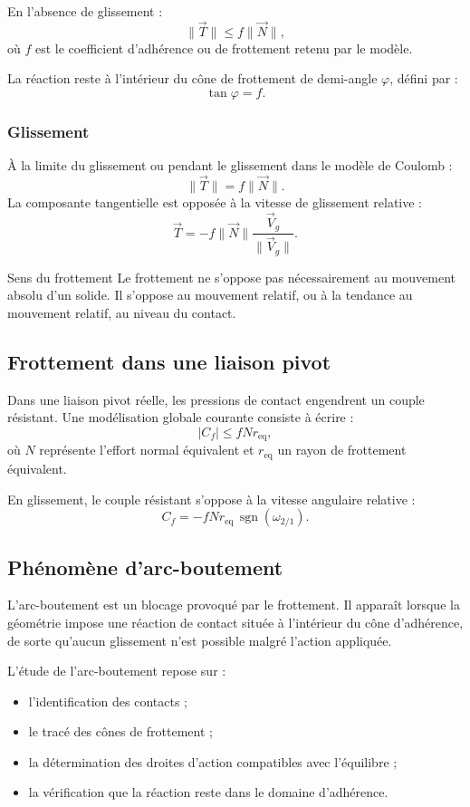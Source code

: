 En l'absence de glissement :
\[
\|\vec T\|\leq f\|\vec N\|,
\]
où $f$ est le coefficient d'adhérence ou de frottement retenu par le modèle.

La réaction reste à l'intérieur du cône de frottement de demi-angle $\varphi$, défini par :
\[
\tan\varphi=f.
\]

\TLConeFrottement

\subsubsection{Glissement}

À la limite du glissement ou pendant le glissement dans le modèle de Coulomb :
\[
\|\vec T\|=f\|\vec N\|.
\]
La composante tangentielle est opposée à la vitesse de glissement relative :
\[
\vec T=-f\|\vec N\|\frac{\vec V_g}{\|\vec V_g\|}.
\]

\begin{TLWarning}{Sens du frottement}
Le frottement ne s'oppose pas nécessairement au mouvement absolu d'un solide. Il s'oppose au mouvement relatif, ou à la tendance au mouvement relatif, au niveau du contact.
\end{TLWarning}

\subsection{Frottement dans une liaison pivot}

Dans une liaison pivot réelle, les pressions de contact engendrent un couple résistant. Une modélisation globale courante consiste à écrire :
\[
|C_f|\leq fN r_{\mathrm{eq}},
\]
où $N$ représente l'effort normal équivalent et $r_{\mathrm{eq}}$ un rayon de frottement équivalent.

En glissement, le couple résistant s'oppose à la vitesse angulaire relative :
\[
C_f=-fN r_{\mathrm{eq}}\,\operatorname{sgn}(\omega_{2/1}).
\]

\subsection{Phénomène d'arc-boutement}

L'arc-boutement est un blocage provoqué par le frottement. Il apparaît lorsque la géométrie impose une réaction de contact située à l'intérieur du cône d'adhérence, de sorte qu'aucun glissement n'est possible malgré l'action appliquée.

L'étude de l'arc-boutement repose sur :
\begin{itemize}
  \item l'identification des contacts ;
  \item le tracé des cônes de frottement ;
  \item la détermination des droites d'action compatibles avec l'équilibre ;
  \item la vérification que la réaction reste dans le domaine d'adhérence.
\end{itemize}

